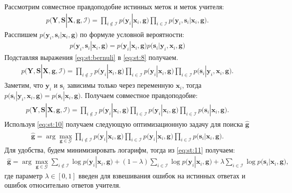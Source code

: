 Рассмотрим совместное правдоподобие истинных меток и меток учителя:
\[
\label{eq:st:8}
\begin{aligned}
p\bigr(\mathbf{Y}, \mathbf{S}|\mathbf{X}, \mathbf{g}, \mathcal{I}\bigr)=\prod_{i\not\in \mathcal{I}}p\bigr(\mathbf{y}_i|\mathbf{x}_i, \mathbf{g}\bigr)\prod_{i\in \mathcal{I}}p\bigr(\mathbf{y}_i, \mathbf{s}_i|\mathbf{x}_i, \mathbf{g}\bigr).
\end{aligned}
\]
Расспишем $p\bigr(\mathbf{y}_i, \mathbf{s}_i|\mathbf{x}_i, \mathbf{g}\bigr)$ по формуле условной вероятности:
\[
\label{eq:st:bernuli}
\begin{aligned}
p\bigr(\mathbf{y}_i, \mathbf{s}_i|\mathbf{x}_i, \mathbf{g}\bigr) = p\bigr(\mathbf{y}_i|\mathbf{x}_i, \mathbf{g}\bigr)p\bigr(\mathbf{s}_i|\mathbf{y}_i, \mathbf{x}_i, \mathbf{g}\bigr)
\end{aligned}
\]
Подставляя выражения \eqref{eq:st:bernuli} в \eqref{eq:st:8} получаем.
\[
\label{eq:st:9}
\begin{aligned}
p\bigr(\mathbf{Y}, \mathbf{S}|\mathbf{X}, \mathbf{g}, \mathcal{I}\bigr)=\prod_{i\not\in \mathcal{I}}p\bigr(\mathbf{y}_i|\mathbf{x}_i, \mathbf{g}\bigr)\prod_{i\in \mathcal{I}}p\bigr(\mathbf{y}_i|\mathbf{x}_i, \mathbf{g}\bigr)\prod_{i\in \mathcal{I}}p\bigr(\mathbf{s}_i|\mathbf{y}_i, \mathbf{x}_i, \mathbf{g}\bigr).
\end{aligned}
\]
Заметим, что $\mathbf{y}_i$ и $\mathbf{s}_i$ зависимы только через переменную $\mathbf{x}_i$, тогда $p\bigr(\mathbf{s}_i|\mathbf{y}_i, \mathbf{x}_i, \mathbf{g}\bigr)=p\bigr(\mathbf{s}_i|\mathbf{x}_i, \mathbf{g}\bigr)$. Получаем совместное правдоподобие:
\[
\label{eq:st:10}
\begin{aligned}
p\bigr(\mathbf{Y}, \mathbf{S}|\mathbf{X}, \mathbf{g}, \mathcal{I}\bigr)=\prod_{i\not\in \mathcal{I}}p\bigr(\mathbf{y}_i|\mathbf{x}_i, \mathbf{g}\bigr)\prod_{i\in \mathcal{I}}p\bigr(\mathbf{y}_i|\mathbf{x}_i, \mathbf{g}\bigr)\prod_{i\in \mathcal{I}}p\bigr(\mathbf{s}_i|\mathbf{x}_i, \mathbf{g}\bigr).
\end{aligned}
\]
Используя \eqref{eq:st:10} получаем следующую оптимизационную задачу для поиска $\hat{\mathbf{g}}$
\[
\label{eq:st:11}
\begin{aligned}
\hat{\mathbf{g}} = \arg\max_{\mathbf{g}\in \mathcal{G}} \prod_{i\not\in \mathcal{I}}p\bigr(\mathbf{y}_i|\mathbf{x}_i, \mathbf{g}\bigr)\prod_{i\in \mathcal{I}}p\bigr(\mathbf{y}_i|\mathbf{x}_i, \mathbf{g}\bigr)\prod_{i\in \mathcal{I}}p\bigr(\mathbf{s}_i|\mathbf{x}_i, \mathbf{g}\bigr).
\end{aligned}
\]
Для удобства, будем минимизировать логарифм, тогда из \eqref{eq:st:11} получаем:
\[
\label{eq:st:12}
\begin{aligned}
\hat{\mathbf{g}} = \arg\max_{\mathbf{g}\in \mathcal{G}} \sum_{i\not\in \mathcal{I}}\log p\bigr(\mathbf{y}_i|\mathbf{x}_i, \mathbf{g}\bigr) + \left(1-\lambda\right)\sum_{i\in \mathcal{I}}\log p\bigr(\mathbf{y}_i|\mathbf{x}_i, \mathbf{g}\bigr) + \lambda\sum_{i\in \mathcal{I}}\log p\bigr(\mathbf{s}_i|\mathbf{x}_i, \mathbf{g}\bigr),
\end{aligned}
\]
где параметр $\lambda \in [0,1]$ введен для взвешивания ошибок на истинных ответах и ошибок относительно ответов учителя.

